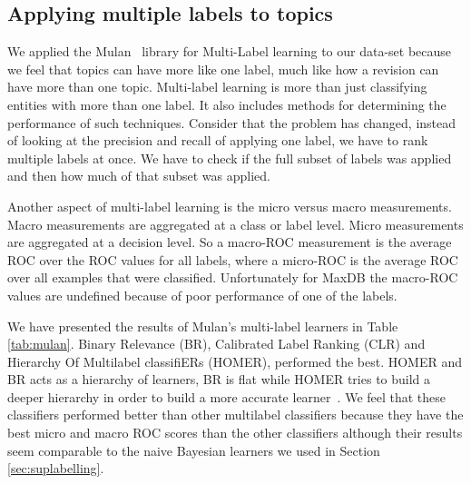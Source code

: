 \documentclass{acm_proc_article-sp}
\begin{document}
\subsection{Applying multiple labels to topics}

We applied the Mulan~\cite{mulan} library for Multi-Label learning to our data-set because we feel that topics can have more like one label, much like how a revision can have more than one topic. Multi-label learning is more than just classifying entities with more than one label. It also includes methods for determining the performance of such techniques. Consider that the problem has changed, instead of looking at the precision and recall of applying one label, we have to rank multiple labels at once. We have to check if the full subset of labels was applied and then how much of that subset was applied.

Another aspect of multi-label learning is the micro versus macro measurements. Macro measurements are aggregated at a class or label level. Micro measurements are aggregated at a decision level. So a macro-ROC measurement is the average ROC over the ROC values for all labels, where a micro-ROC is the average ROC over all examples that were classified. Unfortunately for MaxDB the macro-ROC values are undefined because of poor performance of one of the labels.

We have presented the results of Mulan's multi-label learners in Table \ref{tab:mulan}.  Binary Relevance (BR), Calibrated Label Ranking (CLR) and Hierarchy Of Multilabel classifiERs (HOMER), performed the best. HOMER and BR acts as a hierarchy of learners, BR is flat while HOMER tries to build a deeper hierarchy in order to build a more accurate learner~\cite{mulan}. We feel that these classifiers performed better than other multilabel classifiers because they have the best micro and macro ROC scores than the other classifiers although their results seem comparable to the naive Bayesian learners we used in Section \ref{sec:suplabelling}.
\end{document}
